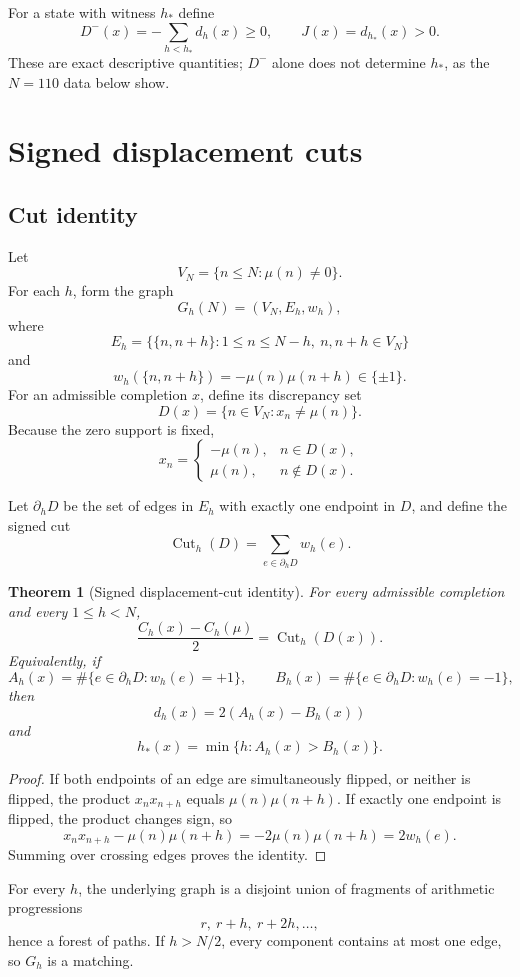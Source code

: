 \documentclass[11pt]{article}
\newtheorem{theorem}{Theorem}[section]
\newcommand{\Cut}{\operatorname{Cut}}
\begin{document}
For a state with witness $h_*$ define
\[
 D^-(x)=-\sum_{h<h_*}d_h(x)\ge0,
 \qquad
 J(x)=d_{h_*}(x)>0.
\]
These are exact descriptive quantities; $D^-$ alone does not determine $h_*$, as the $N=110$ data below show.

\section{Signed displacement cuts}

\subsection{Cut identity}

Let
\[
 V_N=\{n\le N:\mu(n)\ne0\}.
\]
For each $h$, form the graph
\[
 G_h(N)=(V_N,E_h,w_h),
\]
where
\[
 E_h=\{\{n,n+h\}:1\le n\le N-h,\ n,n+h\in V_N\}
\]
and
\[
 w_h(\{n,n+h\})=-\mu(n)\mu(n+h)\in\{\pm1\}.
\]
For an admissible completion $x$, define its discrepancy set
\[
 \boxed{
 D(x)=\{n\in V_N:x_n\ne\mu(n)\}.
 }
\]
Because the zero support is fixed,
\[
 x_n=
 \begin{cases}
 -\mu(n),&n\in D(x),\\
 \mu(n),&n\notin D(x).
 \end{cases}
\]

Let $\partial_hD$ be the set of edges in $E_h$ with exactly one endpoint in $D$, and define the signed cut
\[
 \Cut_h(D)=\sum_{e\in\partial_hD}w_h(e).
\]

\begin{theorem}[Signed displacement-cut identity]
For every admissible completion and every $1\le h<N$,
\[
 \boxed{
 \frac{C_h(x)-C_h(\mu)}2
 =\Cut_h(D(x)).
 }
\]
Equivalently, if
\[
 A_h(x)=\#\{e\in\partial_hD:w_h(e)=+1\},
 \qquad
 B_h(x)=\#\{e\in\partial_hD:w_h(e)=-1\},
\]
then
\[
 \boxed{
 d_h(x)=2(A_h(x)-B_h(x))
 }
\]
and
\[
 \boxed{
 h_*(x)=\min\{h:A_h(x)>B_h(x)\}.
 }
\]
\end{theorem}

\begin{proof}
If both endpoints of an edge are simultaneously flipped, or neither is flipped, the product $x_nx_{n+h}$ equals $\mu(n)\mu(n+h)$.  If exactly one endpoint is flipped, the product changes sign, so
\[
 x_nx_{n+h}-\mu(n)\mu(n+h)
 =-2\mu(n)\mu(n+h)=2w_h(e).
\]
Summing over crossing edges proves the identity.
\end{proof}

For every $h$, the underlying graph is a disjoint union of fragments of arithmetic progressions
\[
 r,\ r+h,\ r+2h,\ldots,
\]
hence a forest of paths.  If $h>N/2$, every component contains at most one edge, so $G_h$ is a matching.
\end{document}
